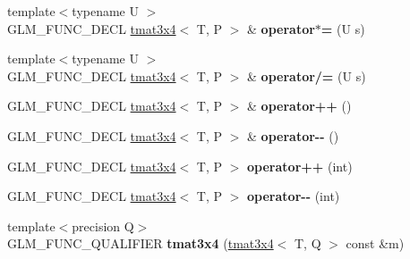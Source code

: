 \begin{DoxyCompactItemize}
\item 
{\footnotesize template$<$typename U $>$ }\\G\+L\+M\+\_\+\+F\+U\+N\+C\+\_\+\+D\+E\+CL \hyperlink{structglm_1_1detail_1_1tmat3x4}{tmat3x4}$<$ T, P $>$ \& {\bfseries operator$\ast$=} (U s)\hypertarget{structglm_1_1detail_1_1tmat3x4_ab07ee1da7bbf72d894107d5ea90b4b50}{}\label{structglm_1_1detail_1_1tmat3x4_ab07ee1da7bbf72d894107d5ea90b4b50}

\item 
{\footnotesize template$<$typename U $>$ }\\G\+L\+M\+\_\+\+F\+U\+N\+C\+\_\+\+D\+E\+CL \hyperlink{structglm_1_1detail_1_1tmat3x4}{tmat3x4}$<$ T, P $>$ \& {\bfseries operator/=} (U s)\hypertarget{structglm_1_1detail_1_1tmat3x4_a0fa10e45cfa4cee78245916ac325150e}{}\label{structglm_1_1detail_1_1tmat3x4_a0fa10e45cfa4cee78245916ac325150e}

\item 
G\+L\+M\+\_\+\+F\+U\+N\+C\+\_\+\+D\+E\+CL \hyperlink{structglm_1_1detail_1_1tmat3x4}{tmat3x4}$<$ T, P $>$ \& {\bfseries operator++} ()\hypertarget{structglm_1_1detail_1_1tmat3x4_a26b88699223e57ea3523a51f76e00dba}{}\label{structglm_1_1detail_1_1tmat3x4_a26b88699223e57ea3523a51f76e00dba}

\item 
G\+L\+M\+\_\+\+F\+U\+N\+C\+\_\+\+D\+E\+CL \hyperlink{structglm_1_1detail_1_1tmat3x4}{tmat3x4}$<$ T, P $>$ \& {\bfseries operator-\/-\/} ()\hypertarget{structglm_1_1detail_1_1tmat3x4_a0537b06d951dd3e6ea5da5c6cd1dc1e5}{}\label{structglm_1_1detail_1_1tmat3x4_a0537b06d951dd3e6ea5da5c6cd1dc1e5}

\item 
G\+L\+M\+\_\+\+F\+U\+N\+C\+\_\+\+D\+E\+CL \hyperlink{structglm_1_1detail_1_1tmat3x4}{tmat3x4}$<$ T, P $>$ {\bfseries operator++} (int)\hypertarget{structglm_1_1detail_1_1tmat3x4_a0d29f6cf76c014e585bf389397fb1db6}{}\label{structglm_1_1detail_1_1tmat3x4_a0d29f6cf76c014e585bf389397fb1db6}

\item 
G\+L\+M\+\_\+\+F\+U\+N\+C\+\_\+\+D\+E\+CL \hyperlink{structglm_1_1detail_1_1tmat3x4}{tmat3x4}$<$ T, P $>$ {\bfseries operator-\/-\/} (int)\hypertarget{structglm_1_1detail_1_1tmat3x4_a681cace6d7cfc6b5b96c076fefd47e11}{}\label{structglm_1_1detail_1_1tmat3x4_a681cace6d7cfc6b5b96c076fefd47e11}

\item 
{\footnotesize template$<$precision Q$>$ }\\G\+L\+M\+\_\+\+F\+U\+N\+C\+\_\+\+Q\+U\+A\+L\+I\+F\+I\+ER {\bfseries tmat3x4} (\hyperlink{structglm_1_1detail_1_1tmat3x4}{tmat3x4}$<$ T, Q $>$ const \&m)\hypertarget{structglm_1_1detail_1_1tmat3x4_affba87d33eccb3e78c8629791c7fc158}{}\label{structglm_1_1detail_1_1tmat3x4_affba87d33eccb3e78c8629791c7fc158}


\end{DoxyCompactItemize}
